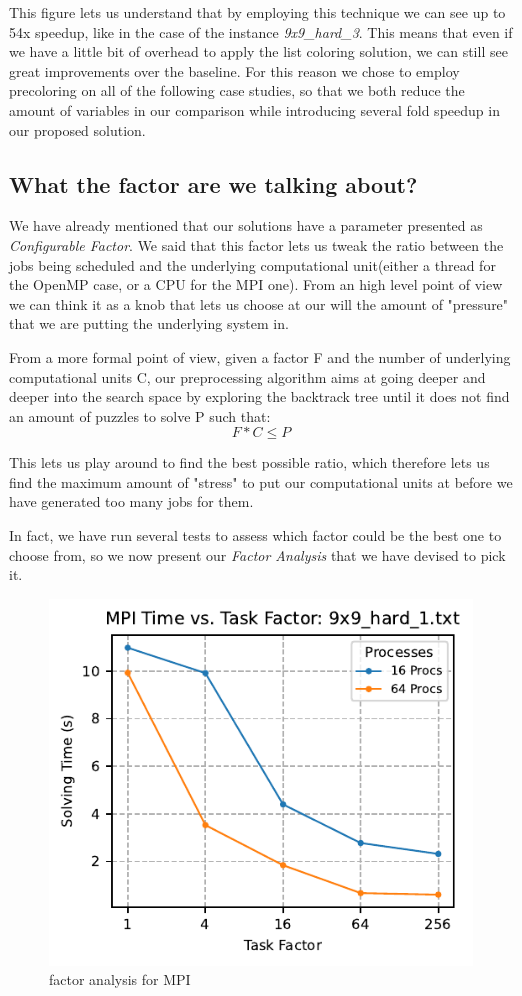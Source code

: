 This figure lets us understand that by employing this technique we can see up to 54x speedup, like in the case of the instance \textit{9x9\_hard\_3}. This means that even if we have a little bit of overhead to apply the list coloring solution, we can still see great improvements over the baseline. For this reason we chose to employ precoloring on all of the following case studies, so that we both reduce the amount of variables in our comparison while introducing several fold speedup in our proposed solution.

\subsection{What the factor are we talking about?}
We have already mentioned that our solutions have a parameter presented as \textit{Configurable Factor}. We said that this factor lets us tweak the ratio between the jobs being scheduled and the underlying computational unit(either a thread for the OpenMP case, or a CPU for the MPI one). From an high level point of view we can think it as a knob that lets us choose at our will the amount of "pressure" that we are putting the underlying system in.

From a more formal point of view, given a factor F and the number of underlying computational units C, our preprocessing algorithm aims at going deeper and deeper into the search space by exploring the backtrack tree until it does not find an amount of puzzles to solve P such that:
\[
    F * C \leq P
\]

This lets us play around to find the best possible ratio, which therefore lets us find the maximum amount of "stress" to put our computational units at before we have generated too many jobs for them.

In fact, we have run several tests to assess which factor could be the best one to choose from, so we now present our \textit{Factor Analysis} that we have devised to pick it.


\begin{figure}[htbp]
\centering
\includegraphics[width=0.9\linewidth]{imgs/factor_analysis_mpi_9x9_hard_1.pdf}
\caption{factor analysis for MPI}
\label{fig:factor_analysis_mpi}
\end{figure}

